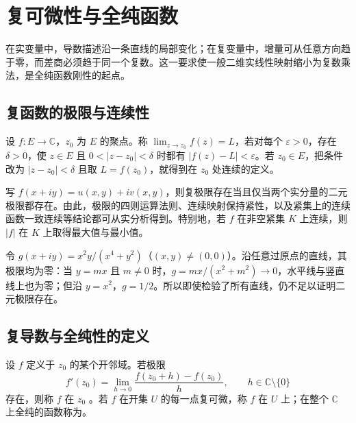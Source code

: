 \documentclass[UTF8,12pt,a4paper,fontset=fandol]{ctexbook}
\begin{document}
\chapter{复可微性与全纯函数}
\label{chap:ca-holomorphic}

在实变量中，导数描述沿一条直线的局部变化；在复变量中，增量可从任意方向趋于零，而差商必须趋于同一个复数。这一要求使一般二维实线性映射缩小为复数乘法，是全纯函数刚性的起点。

\section{复函数的极限与连续性}

设 $f:E\to\mathbb{C}$，$z_0$ 为 $E$ 的聚点。称 $\lim_{z\to z_0}f(z)=L$，若对每个 $\varepsilon>0$，存在 $\delta>0$，使 $z\in E$ 且 $0<|z-z_0|<\delta$ 时都有 $|f(z)-L|<\varepsilon$。若 $z_0\in E$，把条件改为 $|z-z_0|<\delta$ 且取 $L=f(z_0)$，就得到在 $z_0$ 处连续的定义。

写 $f(x+iy)=u(x,y)+iv(x,y)$，则复极限存在当且仅当两个实分量的二元极限都存在。由此，极限的四则运算法则、连续映射保持紧性，以及紧集上的连续函数一致连续等结论都可从实分析得到。特别地，若 $f$ 在非空紧集 $K$ 上连续，则 $|f|$ 在 $K$ 上取得最大值与最小值。

\begin{example}[路径检验的限度]
令 $g(x+iy)=x^2y/(x^4+y^2)$（$(x,y)\ne(0,0)$）。沿任意过原点的直线，其极限均为零：当 $y=mx$ 且 $m\ne0$ 时，$g=mx/(x^2+m^2)\to0$，水平线与竖直线上也为零；但沿 $y=x^2$，$g=1/2$。所以即使检验了所有直线，仍不足以证明二元极限存在。
\end{example}

\section{复导数与全纯性的定义}

\begin{definition}[复导数与全纯函数]
设 $f$ 定义于 $z_0$ 的某个开邻域。若极限
\begin{equation}
  f'(z_0)=\lim_{h\to0}\frac{f(z_0+h)-f(z_0)}{h},\qquad h\in\mathbb{C}\setminus\{0\}
  \label{eq:ca-complex-derivative}
\end{equation}
存在，则称 $f$ 在 $z_0$ 。若 $f$ 在开集 $U$ 的每一点复可微，称 $f$ 在 $U$ 上；在整个 $\mathbb{C}$ 上全纯的函数称为。
\end{definition}
\end{document}
